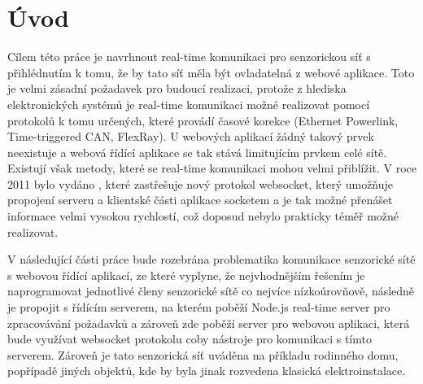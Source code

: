 \chapter{Úvod}
Cílem této práce je navrhnout real-time komunikaci pro senzorickou síť s přihlédnutím k tomu, že by tato síť měla být ovladatelná z webové aplikace. Toto je velmi zásadní požadavek pro budoucí realizaci, protože z hlediska elektronických systémů je real-time komunikaci možné realizovat pomocí protokolů k tomu určených, které provádí časové korekce (Ethernet Powerlink, Time-triggered CAN, FlexRay). U webových aplikací žádný takový prvek neexistuje a webová řídící aplikace se tak stává limitujícím prvkem celé sítě. Existují však metody, které se real-time komunikaci mohou velmi přiblížit. V roce 2011 bylo vydáno \cite[RFC 6455]{rfc6455}, které zastřešuje nový protokol websocket, který umožňuje propojení serveru a klientské části aplikace socketem a je tak možné přenášet informace velmi vysokou rychlostí, což doposud nebylo prakticky téměř možné realizovat.

V následující části práce bude rozebrána problematika komunikace senzorické sítě s webovou řídící aplikací, ze které vyplyne, že nejvhodnějším řešením je naprogramovat jednotlivé členy senzorické sítě co nejvíce nízkoúrovňově, následně je propojit s řídícím serverem, na kterém poběží Node.js real-time server pro zpracovávání požadavků a zároveň zde poběží server pro webovou aplikaci, která bude využívat websocket protokolu coby nástroje pro komunikaci s tímto serverem. Zároveň je tato senzorická síť uváděna na příkladu rodinného domu, popřípadě jiných objektů, kde by byla jinak rozvedena klasická elektroinstalace.
